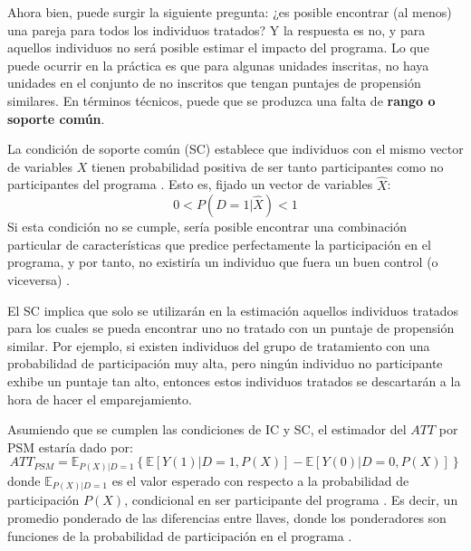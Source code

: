 \documentclass[../../main.tex]{subfiles}
\begin{document}
Ahora bien, puede surgir la siguiente pregunta: ¿es posible encontrar (al menos) una pareja
para todos los individuos tratados? Y la respuesta es no, y para aquellos individuos no
será posible estimar el impacto del programa. Lo que puede ocurrir en la práctica es que
para algunas unidades inscritas, no haya unidades en el conjunto de no inscritos que
tengan puntajes de propensión similares. En términos técnicos, puede que se produzca una
falta de \textbf{rango o soporte común}.

La condición de soporte común (SC) establece que individuos con el mismo vector de
variables \(X\) tienen probabilidad positiva de ser tanto participantes como no
participantes del programa \cite{bernal}. Esto es, fijado un vector de variables
\(\hat{X}\):
\[0 < P(D=1|\hat{X}) < 1\]
Si esta condición no se cumple, sería posible encontrar una combinación particular de
características que predice perfectamente la participación en el programa, y por tanto,
no existiría un individuo que fuera un buen control (o viceversa) \cite{bernal}.

El SC implica que solo se utilizarán en la estimación aquellos individuos tratados para
los cuales se pueda encontrar uno no tratado con un puntaje de propensión similar. Por
ejemplo, si existen individuos del grupo de tratamiento con una probabilidad de
participación muy alta, pero ningún individuo no participante exhibe un puntaje tan alto,
entonces estos individuos tratados se descartarán a la hora de hacer el emparejamiento.

Asumiendo que se cumplen las condiciones de IC y SC, el estimador del \(ATT\) por PSM
estaría dado por:
\begin{equation}
ATT_{PSM} = \mathbb{E}_{P(X)|D=1}
    \left\{
        \mathbb{E}\left[Y(1)|D=1, P(X)\right] - \mathbb{E}\left[Y(0)|D=0, P(X)\right]
    \right\}
    \label{ATT-PSM}
\end{equation}
donde \(\mathbb{E}_{P(X)|D=1}\) es el valor esperado con respecto a la probabilidad de
participación \(P(X)\), condicional en ser participante del programa \cite{bernal}. Es
decir, un promedio ponderado de las diferencias entre llaves, donde los ponderadores
son funciones de la probabilidad de participación en el programa \cite{bernal}.
\end{document}
